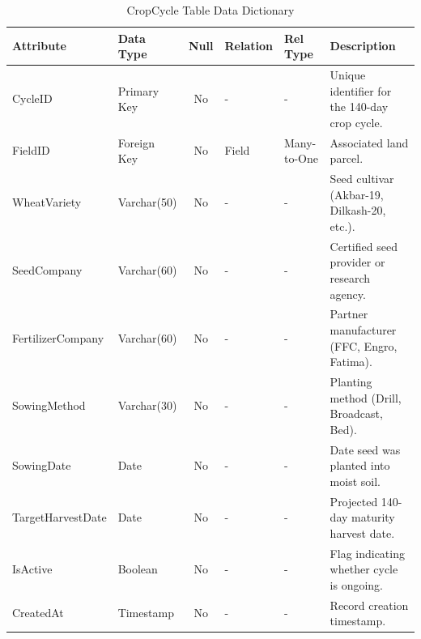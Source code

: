 \begin{table}[H]
\footnotesize
\centering
\caption{CropCycle Table Data Dictionary}
\label{tab:cropcycle_table}
\begin{tabular}{|l|l|c|l|l|p{4.5cm}|}
\hline
\textbf{Attribute} & \textbf{Data Type} & \textbf{Null} & \textbf{Relation} & \textbf{Rel Type} & \textbf{Description} \\ \hline
CycleID & Primary Key & No & - & - & Unique identifier for the 140-day crop cycle. \\ \hline
FieldID & Foreign Key & No & Field & Many-to-One & Associated land parcel. \\ \hline
WheatVariety & Varchar(50) & No & - & - & Seed cultivar (Akbar-19, Dilkash-20, etc.). \\ \hline
SeedCompany & Varchar(60) & No & - & - & Certified seed provider or research agency. \\ \hline
FertilizerCompany & Varchar(60) & No & - & - & Partner manufacturer (FFC, Engro, Fatima). \\ \hline
SowingMethod & Varchar(30) & No & - & - & Planting method (Drill, Broadcast, Bed). \\ \hline
SowingDate & Date & No & - & - & Date seed was planted into moist soil. \\ \hline
TargetHarvestDate & Date & No & - & - & Projected 140-day maturity harvest date. \\ \hline
IsActive & Boolean & No & - & - & Flag indicating whether cycle is ongoing. \\ \hline
CreatedAt & Timestamp & No & - & - & Record creation timestamp. \\ \hline
\end{tabular}
\end{table}

